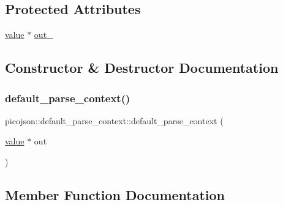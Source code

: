 \subsection*{Protected Attributes}
\begin{DoxyCompactItemize}
\item 
\hyperlink{classpicojson_1_1value}{value} $\ast$ \hyperlink{classpicojson_1_1default__parse__context_a89547d73da32e470068649e54646ff19}{out\+\_\+}
\end{DoxyCompactItemize}


\subsection{Constructor \& Destructor Documentation}
\hypertarget{classpicojson_1_1default__parse__context_ad326572abe85f9d05dc23be4cf76ff3c}{}\label{classpicojson_1_1default__parse__context_ad326572abe85f9d05dc23be4cf76ff3c} 
\subsubsection{\texorpdfstring{default\+\_\+parse\+\_\+context()}{default\_parse\_context()}}
{\footnotesize\ttfamily picojson\+::default\+\_\+parse\+\_\+context\+::default\+\_\+parse\+\_\+context (\begin{DoxyParamCaption}\item[{\hyperlink{classpicojson_1_1value}{value} $\ast$}]{out }\end{DoxyParamCaption})\hspace{0.3cm}{\ttfamily [inline]}}



\subsection{Member Function Documentation}
\hypertarget{classpicojson_1_1default__parse__context_a5f65224e655633b20c1f8c5967c153bb}{}\label{classpicojson_1_1default__parse__context_a5f65224e655633b20c1f8c5967c153bb} 
